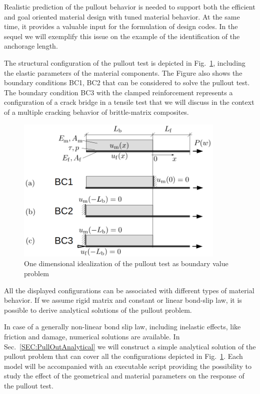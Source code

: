 \documentclass[main.tex]{subfiles}
\begin{document}
Realistic prediction of the pullout behavior is needed to support both the efficient and goal oriented material design with tuned material behavior. 
At the same time, it provides a valuable input for the formulation of design codes. In the sequel we will exemplify this issue on the example of the identification of the anchorage length. 

The structural configuration of the pullout test is depicted in  Fig.~\ref{fig_pull-out_rigid_matrix}, including the elastic parameters of the material components. The Figure also shows the boundary conditions BC1, BC2 that can be considered to solve the pullout test. The boundary condition BC3 with the clamped reinforcement represents a configuration of a crack bridge in a tensile test that we will discuss in the context of a multiple cracking behavior of brittle-matrix composites.


\begin{figure}[ht]
	\centering
  \includegraphics[width=10cm]{fig/Lecture02/figure_pullouts.png}
	\caption{One dimensional idealization of the pullout test as boundary value problem}
	\label{fig_pull-out_rigid_matrix}
\end{figure}
All the displayed configurations can be associated with different types of material behavior. If we assume rigid matrix and constant or linear bond-slip law, it is possible to derive analytical solutions of the pullout problem.

In case of a generally non-linear bond slip law, including inelastic effects, like friction and damage, numerical solutions are available.
In Sec.~\ref{SEC:PullOutAnalytical} we will construct a simple analytical
solution of the pullout problem that can cover all the configurations depicted in Fig.~\ref{fig_pull-out_rigid_matrix}. Each model will be accompanied
with an executable script providing the possibility to study the effect
of the geometrical and material parameters on the response of the pullout test.
\end{document}
